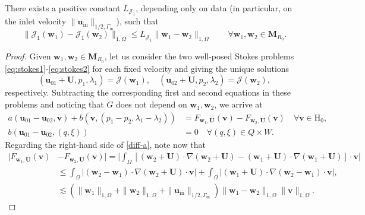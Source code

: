 \documentclass[onefignum,onetabnum,reqno,a4paper,final]{siamart250211}
\newcommand\bu{\boldsymbol{u}}
\newcommand\bv{\boldsymbol{v}}
\newcommand\bw{\boldsymbol{w}}
\newcommand\bM{\mathbf{M}}
\newcommand\0{\mathbf{0}}
\newcommand\bU{\boldsymbol{U}}
\newcommand\bH{\boldsymbol{\mathrm{H}}}
\newcommand\bX{\boldsymbol{\mathrm{X}}}
\newcommand\Gi{\Gamma_{\mathrm{in}}}
\newcommand\buin{\boldsymbol{u}_{\mathrm{in}}}
\numberwithin{figure}{section}
\numberwithin{table}{section}
\begin{document}
\begin{lemma}\label{lem:ns-lip}
 There exists a positive constant $L_{\mathcal{J}_1}$, depending only on data (in particular, on the inlet velocity $\|\bu_{\mathrm{in}}\|_{1/2,\Gi}$), such that 
 \[\|\mathcal{J}_1(\bw_1)- \mathcal{J}_1(\bw_2)\|_{1,\Omega} \leq L_{\mathcal{J}_1} \|\bw_1 - \bw_2\|_{1,\Omega} \qquad \forall \bw_1,\bw_2 \in \bM_{R_0}.\]
\end{lemma}
\begin{proof}
Given $\bw_1,\bw_2 \in \bM_{R_0}$, let us consider the two well-posed Stokes problems \eqref{eq:stokes1}-\eqref{eq:stokes2} for each fixed velocity and giving the unique solutions 
\[(\bu_{01}+\bU,p_1,\lambda_1) = \mathcal{J}(\bw_1), \quad (\bu_{02}+\bU,p_2,\lambda_2) = \mathcal{J}(\bw_2) ,\]
respectively. %
Subtracting the corresponding first and second equations in these problems and noticing that $G$ does not depend on $\bw_1,\bw_2$, we arrive at 
\begin{subequations}\label{diff-}
  \begin{align}
 \label{diff-a}	   a(\bu_{01}-\bu_{02},\bv)  + b(\bv,(p_1-p_2,\lambda_1-\lambda_2)) & = F_{\bw_1,\bU}(\bv) -F_{\bw_2,\bU}(\bv) \quad \forall \bv \in \bH_0,\\
 			   b(\bu_{01}-\bu_{02},(q,\xi)) & = 0 \quad \forall (q,\xi)\in Q\times W.
 		\end{align}\end{subequations}
Regarding  the right-hand side of \eqref{diff-a}, note now that 
\begin{align*}
|F_{\bw_1,\bU}(\bv) &-F_{\bw_2,\bU}(\bv) |  = \biggl|\int_\Omega [(\bw_2+\bU)\cdot \nabla (\bw_2+\bU)-(\bw_1+\bU)\cdot \nabla (\bw_1+\bU)]\cdot \bv\biggr| \\
& \leq \int_\Omega |(\bw_2 - \bw_1)\cdot \nabla (\bw_2+\bU) \cdot \bv | + \int_\Omega |(\bw_1+\bU) \cdot \nabla (\bw_2-\bw_1) \cdot \bv|,\\
& \lesssim (\|\bw_1\|_{1,\Omega} + \|\bw_2\|_{1,\Omega} + \|\buin\|_{1/2,\Gi})\|\bw_1-\bw_2\|_{1,\Omega}\|\bv\|_{1,\Omega}.
\end{align*}



\end{proof}
\end{document}
